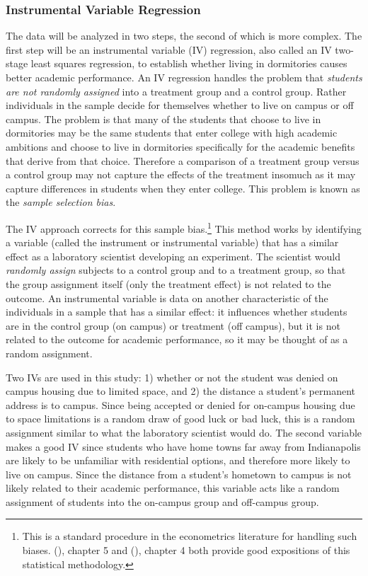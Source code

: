 \documentclass[11pt]{article}
\newcommand{\citee}[1]{\citename{#1} (\citeyear{#1})}
\begin{document}
\subsubsection{Instrumental Variable Regression}
The data will be analyzed in two steps, the second of which is more complex.  The first step will be an instrumental variable (IV) regression, also called an IV two-stage least squares regression, to establish whether living in dormitories causes better academic performance.  An IV regression handles the problem that \textit{students are not randomly assigned} into a treatment group and a control group.  Rather individuals in the sample decide for themselves whether to live on campus or off campus.  The problem is that many of the students that choose to live in dormitories may be the same students that enter college with high academic ambitions and choose to live in dormitories specifically for the academic benefits that derive from that choice.  Therefore a comparison of a treatment group versus a control group may not capture the effects of the treatment insomuch as it may capture differences in students when they enter college.  This problem is known as the \textit{sample selection bias}.

The IV approach corrects for this sample bias.\footnote{This is a standard procedure in the econometrics literature for handling such biases. \citee{wooldridge}, chapter 5 and \citee{trivedi}, chapter 4 both provide good expositions of this statistical methodology.} This method works by identifying a variable (called the instrument or instrumental variable) that has a similar effect as a laboratory scientist developing an experiment.  The scientist would \textit{randomly assign} subjects to a control group and to a treatment group, so that the group assignment itself (only the treatment effect) is not related to the outcome.  An instrumental variable is data on another characteristic of the individuals in a sample that has a similar effect: it influences whether students are in the control group (on campus) or treatment (off campus), but it is not related to the outcome for academic performance, so it may be thought of as a random assignment.

Two IVs are used in this study: 1) whether or not the student was denied on campus housing due to limited space, and 2) the distance a student's permanent address is to campus.  Since being accepted or denied for on-campus housing due to space limitations is a random draw of good luck or bad luck, this is a random assignment similar to what the laboratory scientist would do.  The second variable makes a good IV since students who have home towns far away from Indianapolis are likely to be unfamiliar with residential options, and therefore more likely to live on campus.  Since the distance from a student's hometown to campus is not likely related to their academic performance, this variable acts like a random assignment of students into the on-campus group and off-campus group.
\end{document}
